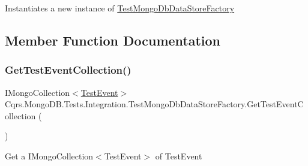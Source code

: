 Instantiates a new instance of \hyperlink{classCqrs_1_1MongoDB_1_1Tests_1_1Integration_1_1TestMongoDbDataStoreFactory}{Test\+Mongo\+Db\+Data\+Store\+Factory} 



\subsection{Member Function Documentation}
\mbox{\label{classCqrs_1_1MongoDB_1_1Tests_1_1Integration_1_1TestMongoDbDataStoreFactory_a65d996d53f32b1a40121052193b582fa_a65d996d53f32b1a40121052193b582fa}} 
\subsubsection{\texorpdfstring{Get\+Test\+Event\+Collection()}{GetTestEventCollection()}}
{\footnotesize\ttfamily I\+Mongo\+Collection$<$\hyperlink{classCqrs_1_1Azure_1_1ServiceBus_1_1Tests_1_1Unit_1_1TestEvent}{Test\+Event}$>$ Cqrs.\+Mongo\+D\+B.\+Tests.\+Integration.\+Test\+Mongo\+Db\+Data\+Store\+Factory.\+Get\+Test\+Event\+Collection (\begin{DoxyParamCaption}{ }\end{DoxyParamCaption})}



Get a I\+Mongo\+Collection$<$\+Test\+Event$>$ of Test\+Event 

